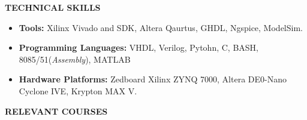 \documentclass{article}
\newcommand{\hilight}[1]{\colorbox{light-gray}{#1}}
\begin{document}
%
 \begin{theorem}
   \vspace{-0.7mm}
\begin{center}
\textbf{ TECHNICAL SKILLS
}\end{center}  
\vspace{-0.7mm}    
   \end{theorem}
\vspace{-3mm}
\begin{itemize}
\item \textbf{Tools:}  Xilinx Vivado and SDK, Altera Qaurtus, GHDL, Ngspice, ModelSim. 
\vspace{-1.5mm}
 \item \textbf{Programming Languages:}
VHDL, Verilog, Pytohn, C, BASH, 8085/51(\textit{Assembly}), MATLAB
\vspace{-1.5mm}
\item \textbf{Hardware Platforms:} Zedboard Xilinx ZYNQ 7000, Altera DE0-Nano Cyclone IVE, Krypton MAX V.
\end{itemize}
\vspace{-3mm}
 \begin{theorem}
   \vspace{-0.7mm}
\begin{center}
\textbf{ RELEVANT COURSES
}\end{center}  
\vspace{-0.7mm}    
   \end{theorem}
\vspace{-3mm}
\end{document}

